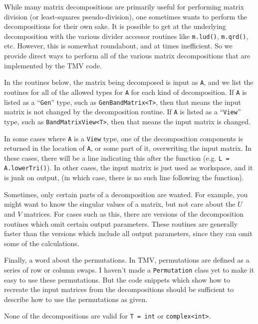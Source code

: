 \documentclass[twoside,letterpaper,11pt]{article}
\renewcommand{\tt}[1]{{\lstinline {#1}}}
\begin{document}
While many matrix decompositions are primarily useful for performing matrix division
(or least-squares pseudo-division), one sometimes wants to perform the decompositions for 
their own sake.  It is possible to get at the underlying decomposition with the various
divider accessor routines like \tt{m.lud()}, \tt{m.qrd()}, etc.  However, this is somewhat
roundabout, and at times inefficient.  So we provide direct ways to perform all of
the various matrix decompositions that are implemented by the TMV code.

In the routines below, the matrix being decomposed is input as \tt{A}, and we
list the routines for all of the 
allowed types for \tt{A} for each kind of decomposition.  If \tt{A} is listed as a ``\tt{Gen}''
type, such as \tt{GenBandMatrix<T>}, then that means the input matrix is not 
changed by the decomposition routine.  
If \tt{A} is listed as a ``\tt{View}'' type,
such as \tt{BandMatrixView<T>}, then that means the input matrix is 
changed.  

In some cases where \tt{A} is a \tt{View} type, one of the decomposition components is 
returned in the location of 
\tt{A}, or some part of it, overwriting the input matrix.  
In these cases, there will be a line indicating this
after the function (e.g. \tt{L = A.lowerTri()}).
In other cases, the input matrix is just used as workspace, and it is junk
on output, (in which case, there is no such line following the function).

Sometimes, only certain parts of a decomposition are wanted.  For example,
you might want to know the singular values of a matrix, but not care about
the $U$ and $V$ matrices.  For cases such as this, there are versions
of the decomposition routines which omit certain output parameters.
These routines are generally faster than the versions which include all
output parameters, since they can omit some of the calculations.

Finally, a word about the permutations.  In TMV, permutations are
defined as a series of row or column swaps.  I haven't made a \tt{Permutation}
class yet to make it easy to use these permutations.  But the 
code snippets which show how to recreate the input matrices from
the decompositions should be sufficient to describe how to use the 
permutations as given.

None of the decompositions are valid for \tt{T = int} or \tt{complex<int>}.
\end{document}
